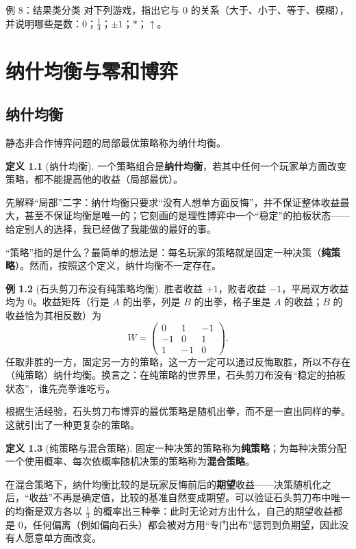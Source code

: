 \documentclass[UTF8,a4paper,11pt,oneside,openany,fontset=fandol]{ctexbook}
\theoremstyle{definition}
\newtheorem{definition}{定义}[chapter]
\newtheorem{example}[definition]{例}
\begin{document}
\begin{problem}{例 8：结果类分类}
对下列游戏，指出它与 $0$ 的关系（大于、小于、等于、模糊），并说明哪些是数：$0$；$\tfrac14$；$\pm1$；$\ast$；$\uparrow$。
\end{problem}

\chapter{纳什均衡与零和博弈}
\section{纳什均衡}
静态非合作博弈问题的局部最优策略称为纳什均衡。

\begin{definition}[纳什均衡]
一个策略组合是\textbf{纳什均衡}，若其中任何一个玩家单方面改变策略，都不能提高他的收益（局部最优）。
\end{definition}

先解释“局部”二字：纳什均衡只要求“没有人想单方面反悔”，并不保证整体收益最大，甚至不保证均衡是唯一的；它刻画的是理性博弈中一个“稳定”的拍板状态——给定别人的选择，我已经做了我能做的最好的事。

“策略”指的是什么？最简单的想法是：每名玩家的策略就是固定一种决策（\textbf{纯策略}）。然而，按照这个定义，纳什均衡不一定存在。

\begin{example}[石头剪刀布没有纯策略均衡]
胜者收益 $+1$，败者收益 $-1$，平局双方收益均为 $0$。收益矩阵（行是 $A$ 的出拳，列是 $B$ 的出拳，格子里是 $A$ 的收益；$B$ 的收益恰为其相反数）为
\[
 W=\begin{pmatrix}0&1&-1\\-1&0&1\\1&-1&0\end{pmatrix}.
\]
任取非胜的一方，固定另一方的策略，这一方一定可以通过反悔取胜，所以不存在（纯策略）纳什均衡。换言之：在纯策略的世界里，石头剪刀布没有“稳定的拍板状态”，谁先亮拳谁吃亏。
\end{example}

根据生活经验，石头剪刀布博弈的最优策略是随机出拳，而不是一直出同样的拳。这就引出了一种更复杂的策略。

\begin{definition}[纯策略与混合策略]
固定一种决策的策略称为\textbf{纯策略}；为每种决策分配一个使用概率、每次依概率随机决策的策略称为\textbf{混合策略}。
\end{definition}

在混合策略下，纳什均衡比较的是玩家反悔前后的\textbf{期望}收益——决策随机化之后，“收益”不再是确定值，比较的基准自然变成期望。可以验证石头剪刀布中唯一的均衡是双方各以 $\tfrac13$ 的概率出三种拳：此时无论对方出什么，自己的期望收益都是 $0$，任何偏离（例如偏向石头）都会被对方用“专门出布”惩罚到负期望，因此没有人愿意单方面改变。
\end{document}
